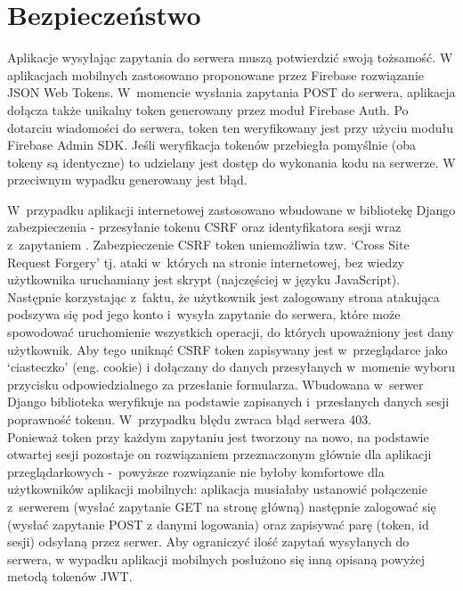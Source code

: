 \section{Bezpieczeństwo}

Aplikacje wysyłając zapytania do serwera muszą potwierdzić swoją tożsamość. 
W aplikacjach mobilnych zastosowano proponowane przez Firebase rozwiązanie JSON Web Tokens. W~momencie wysłania zapytania POST do serwera, aplikacja dołącza także unikalny token generowany przez moduł Firebase Auth. Po dotarciu wiadomości do serwera, token ten weryfikowany jest przy użyciu modułu Firebase Admin SDK. Jeśli weryfikacja tokenów przebiegła pomyślnie (oba tokeny są identyczne) to udzielany jest dostęp do wykonania kodu na serwerze. W przeciwnym wypadku generowany jest błąd.

W~przypadku aplikacji internetowej zastosowano wbudowane w bibliotekę Django zabezpieczenia - przesyłanie tokenu CSRF oraz identyfikatora sesji wraz z~zapytaniem \cite{djangoCSRF}. Zabezpieczenie CSRF token uniemożliwia tzw. `Cross Site Request Forgery' tj. ataki w~których na stronie internetowej, bez wiedzy użytkownika uruchamiany jest skrypt (najczęściej w języku JavaScript). Następnie korzystając z~faktu, że użytkownik jest zalogowany strona atakująca podszywa się pod jego konto i~wysyła zapytanie do serwera, które może spowodować uruchomienie wszystkich operacji, do których upoważniony jest dany użytkownik. Aby tego uniknąć CSRF token zapisywany jest w~przeglądarce jako `ciasteczko' (eng. cookie) i dołączany do danych przesyłanych w~momenie wyboru przycisku odpowiedzialnego za przesłanie formularza. Wbudowana w~serwer Django biblioteka weryfikuje na podstawie zapisanych i~przesłanych danych sesji poprawność tokenu. W~przypadku błędu zwraca błąd serwera 403.
\\Ponieważ token przy każdym zapytaniu jest tworzony na nowo, na podstawie otwartej sesji pozostaje on rozwiązaniem przeznaczonym głównie dla aplikacji przeglądarkowych -~powyższe rozwiązanie nie byłoby komfortowe dla użytkowników aplikacji mobilnych: aplikacja musiałaby ustanowić połączenie z~serwerem (wysłać zapytanie GET na stronę główną) następnie zalogować się (wysłać zapytanie POST z danymi logowania) oraz zapisywać parę (token, id sesji) odsyłaną przez serwer. Aby ograniczyć ilość zapytań wysyłanych do serwera, w wypadku aplikacji mobilnych posłużono się inną opisaną powyżej metodą tokenów JWT.
